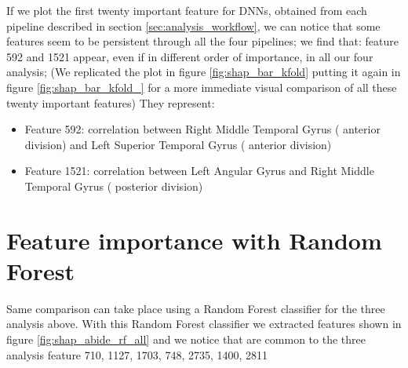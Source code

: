 \documentclass[10pt]{report}
\begin{document}
If we plot the first twenty important feature for DNNs, obtained from each pipeline described in section \ref{sec:analysis_workflow}, we can notice that some features seem to be persistent through all the four pipelines; we find that: feature 592 and 1521 appear, even if in different order of importance, in all our four analysis;
(We replicated the plot in figure \ref{fig:shap_bar_kfold} putting it again in figure \ref{fig:shap_bar_kfold_} for a more immediate visual comparison of all these twenty important features)
They represent:
\begin{itemize}
\item Feature 592: correlation between Right Middle Temporal Gyrus ( anterior division) and Left Superior Temporal Gyrus ( anterior division)
\item Feature 1521: correlation between Left Angular Gyrus  and Right Middle Temporal Gyrus ( posterior division)

\end{itemize}



\section{Feature importance with Random Forest}\label{sec:feature_importance_rf}

Same comparison can take place using a Random Forest classifier for the three analysis above.
With this Random Forest classifier we extracted features shown in figure \ref{fig:shap_abide_rf_all} and we notice that are common to the three analysis feature 710, 1127, 1703, 748, 2735, 1400, 2811
\end{document}
